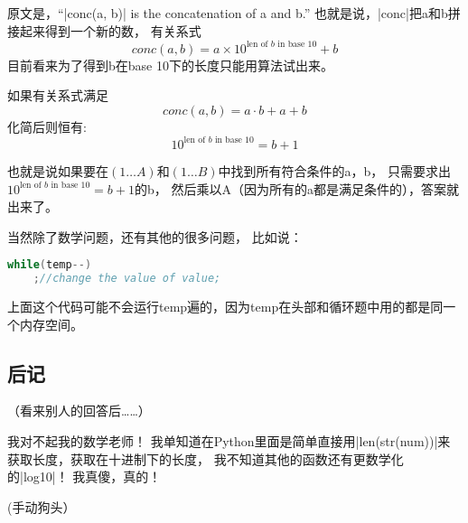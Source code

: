 原文是，``\vb|conc(a, b)| is the concatenation of a and b.''
也就是说，\vb|conc|把a和b拼接起来得到一个新的数，
有关系式$$conc(a, b) = a\times 10^{\text{len of }b\text{ in base 10}} + b$$
目前看来为了得到b在base 10下的长度只能用算法试出来。

如果有关系式满足$$conc(a, b) = a\cdot b + a + b$$化简后则恒有:
$$10^{\text{len of }b\text{ in base 10}} = b + 1$$

也就是说如果要在$(1\ldots A)$和$(1\ldots B)$中找到所有符合条件的a，b，
只需要求出$10^{\text{len of }b\text{ in base 10}} = b + 1$的b，
然后乘以A（因为所有的a都是满足条件的），答案就出来了。

当然除了数学问题，还有其他的很多问题，
比如说：

\begin{lstlisting}[language=C++]
while(temp--)
    ;//change the value of value;
\end{lstlisting}

上面这个代码可能不会运行temp遍的，因为temp在头部和循环题中用的都是同一个内存空间。

\subsection{后记}
（看来别人的回答后\ldots\ldots ）

我对不起我的数学老师！
我单知道在Python里面是简单直接用\vb|len(str(num))|来获取长度，获取在十进制下的长度，
我不知道其他的函数还有更数学化的\vb|log10|！
我真傻，真的！

(手动狗头）

